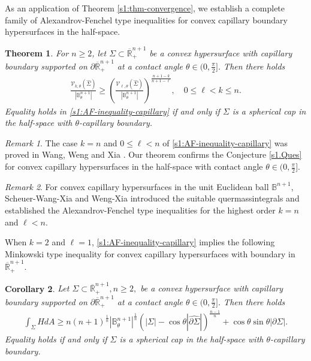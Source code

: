 \documentclass[11pt,reqno]{amsart}
\newtheorem{thm}{Theorem}[section]
\newtheorem{cor}[thm]{Corollary}
\theoremstyle{definition}
\theoremstyle{remark}
\newtheorem{rem}{Remark}
\numberwithin{equation}{section}
\renewcommand{\(}{\left(}
\renewcommand{\)}{\right)}
\renewcommand{\-}{\overline}
\renewcommand{\t}{\theta}
\begin{document}
As an application of Theorem \ref{s1:thm-convergence}, we establish a complete family of Alexandrov-Fenchel type inequalities for convex capillary boundary hypersurfaces in the half-space.
\begin{thm}\label{s1:thm-AF-ineq}
	For $n\geq 2$, let $\Sigma\subset \-{\mathbb R}^{n+1}_{+}$ be a convex hypersurface with capillary boundary supported on $\partial\-{\mathbb R}_{+}^{n+1}$ at a contact angle $\theta\in (0,\frac{\pi}{2}]$. Then there holds
	\begin{align}\label{s1:AF-inequality-capillary}
	\frac{\mathcal{V}_{k,\t}(\widehat{\Sigma})}{|\mathbb B_\t^{n+1}|} \geq \(\frac{\mathcal{V}_{\ell,\t}(\widehat{\Sigma})}{|\mathbb B_\t^{n+1}|}\)^\frac{n+1-k}{n+1-\ell}, \quad 0\leq \ell<k\leq n.
	\end{align}
	Equality holds in \eqref{s1:AF-inequality-capillary} if and only if $\Sigma$ is a spherical cap  in the half-space with $\t$-capillary boundary.
\end{thm}
\begin{rem}
The case $k=n$ and $0\leq \ell<n$ of \eqref{s1:AF-inequality-capillary} was proved in Wang, Weng and Xia \cite[Theorem 1.2]{Wang-Weng-Xia2022}. Our theorem confirms the Conjecture \ref{s1.Ques} for convex capillary hypersurfaces in the half-space with contact angle $\t\in (0,\frac{\pi}{2}]$.
\end{rem}
\begin{rem}
For convex capillary hypersurfaces in the unit Euclidean ball $\mathbb{B}^{n+1}$, Scheuer-Wang-Xia \cite{Scheuer-Wang-Xia2018} and Weng-Xia \cite{WengX21} introduced the suitable quermassintegrals and established the Alexandrov-Fenchel type inequalities for the highest order $k=n$ and $\ell<n$.
\end{rem}

When $k=2$ and $\ell=1$, \eqref{s1:AF-inequality-capillary} implies the following Minkowski type inequality for convex capillary hypersurfaces with boundary in $\-{\mathbb R}^{n+1}_{+}$.
\begin{cor}\label{s1:cor-Minkowski-ineq}
	Let $\Sigma\subset \-{\mathbb R}^{n+1}_{+}, n\geq 2, $ be a convex hypersurface with capillary boundary supported on $\partial\-{\mathbb R}_{+}^{n+1}$ at a contact angle $\theta\in (0,\frac{\pi}{2}]$. Then there holds
	\begin{align}\label{s1.Minkowski-type-ineq}
	\int_{\Sigma} H dA \geq n(n+1)^\frac{1}{n}|\mathbb B_{\t}^{n+1}|^\frac{1}{n}\(|\Sigma|-\cos\t|\widehat{\partial \Sigma}|\)^\frac{n-1}{n}+\cos\t \sin\t|\partial \Sigma|.
	\end{align}
	Equality holds if and only if $\Sigma$ is a spherical cap  in the half-space with $\t$-capillary boundary.
\end{cor}
\end{document}
